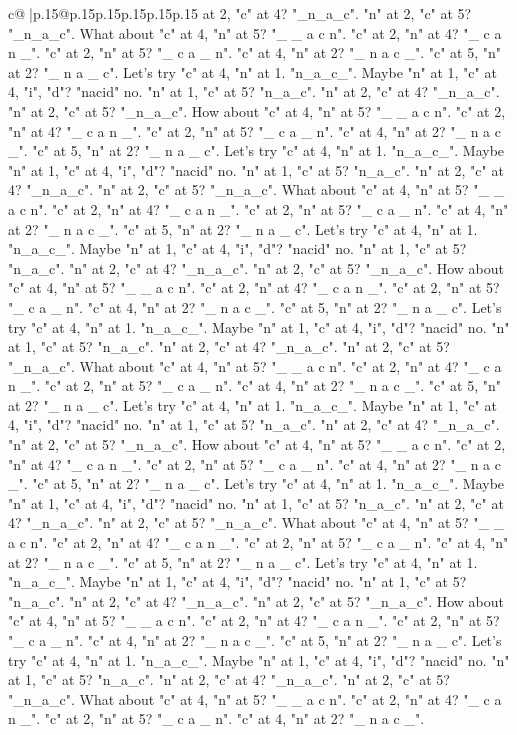 \documentclass{article}
\begin{document}
{\begin{supertabular}{c@{$\;$}|p{.15\linewidth}@{}p{.15\linewidth}p{.15\linewidth}p{.15\linewidth}p{.15\linewidth}p{.15\linewidth}}
{{{at 2, "c" at 4? "\_n\_a\_c". "n" at 2, "c" at 5? "\_n\_a\_c". What about "c" at 4, "n" at 5? "\_ \_ a c n". "c" at 2, "n" at 4? "\_ c a n \_". "c" at 2, "n" at 5? "\_ c a \_ n". "c" at 4, "n" at 2? "\_ n a c \_". "c" at 5, "n" at 2? "\_ n a \_ c". Let's try "c" at 4, "n" at 1. "n\_a\_c\_". Maybe "n" at 1, "c" at 4, "i", "d"? "nacid" no. "n" at 1, "c" at 5? "n\_a\_c". "n" at 2, "c" at 4? "\_n\_a\_c". "n" at 2, "c" at 5? "\_n\_a\_c". How about "c" at 4, "n" at 5? "\_ \_ a c n". "c" at 2, "n" at 4? "\_ c a n \_". "c" at 2, "n" at 5? "\_ c a \_ n". "c" at 4, "n" at 2? "\_ n a c \_". "c" at 5, "n" at 2? "\_ n a \_ c". Let's try "c" at 4, "n" at 1. "n\_a\_c\_". Maybe "n" at 1, "c" at 4, "i", "d"? "nacid" no. "n" at 1, "c" at 5? "n\_a\_c". "n" at 2, "c" at 4? "\_n\_a\_c". "n" at 2, "c" at 5? "\_n\_a\_c". What about "c" at 4, "n" at 5? "\_ \_ a c n". "c" at 2, "n" at 4? "\_ c a n \_". "c" at 2, "n" at 5? "\_ c a \_ n". "c" at 4, "n" at 2? "\_ n a c \_". "c" at 5, "n" at 2? "\_ n a \_ c". Let's try "c" at 4, "n" at 1. "n\_a\_c\_". Maybe "n" at 1, "c" at 4, "i", "d"? "nacid" no. "n" at 1, "c" at 5? "n\_a\_c". "n" at 2, "c" at 4? "\_n\_a\_c". "n" at 2, "c" at 5? "\_n\_a\_c". How about "c" at 4, "n" at 5? "\_ \_ a c n". "c" at 2, "n" at 4? "\_ c a n \_". "c" at 2, "n" at 5? "\_ c a \_ n". "c" at 4, "n" at 2? "\_ n a c \_". "c" at 5, "n" at 2? "\_ n a \_ c". Let's try "c" at 4, "n" at 1. "n\_a\_c\_". Maybe "n" at 1, "c" at 4, "i", "d"? "nacid" no. "n" at 1, "c" at 5? "n\_a\_c". "n" at 2, "c" at 4? "\_n\_a\_c". "n" at 2, "c" at 5? "\_n\_a\_c". What about "c" at 4, "n" at 5? "\_ \_ a c n". "c" at 2, "n" at 4? "\_ c a n \_". "c" at 2, "n" at 5? "\_ c a \_ n". "c" at 4, "n" at 2? "\_ n a c \_". "c" at 5, "n" at 2? "\_ n a \_ c". Let's try "c" at 4, "n" at 1. "n\_a\_c\_". Maybe "n" at 1, "c" at 4, "i", "d"? "nacid" no. "n" at 1, "c" at 5? "n\_a\_c". "n" at 2, "c" at 4? "\_n\_a\_c". "n" at 2, "c" at 5? "\_n\_a\_c". How about "c" at 4, "n" at 5? "\_ \_ a c n". "c" at 2, "n" at 4? "\_ c a n \_". "c" at 2, "n" at 5? "\_ c a \_ n". "c" at 4, "n" at 2? "\_ n a c \_". "c" at 5, "n" at 2? "\_ n a \_ c". Let's try "c" at 4, "n" at 1. "n\_a\_c\_". Maybe "n" at 1, "c" at 4, "i", "d"? "nacid" no. "n" at 1, "c" at 5? "n\_a\_c". "n" at 2, "c" at 4? "\_n\_a\_c". "n" at 2, "c" at 5? "\_n\_a\_c". What about "c" at 4, "n" at 5? "\_ \_ a c n". "c" at 2, "n" at 4? "\_ c a n \_". "c" at 2, "n" at 5? "\_ c a \_ n". "c" at 4, "n" at 2? "\_ n a c \_". "c" at 5, "n" at 2? "\_ n a \_ c". Let's try "c" at 4, "n" at 1. "n\_a\_c\_". Maybe "n" at 1, "c" at 4, "i", "d"? "nacid" no. "n" at 1, "c" at 5? "n\_a\_c". "n" at 2, "c" at 4? "\_n\_a\_c". "n" at 2, "c" at 5? "\_n\_a\_c". How about "c" at 4, "n" at 5? "\_ \_ a c n". "c" at 2, "n" at 4? "\_ c a n \_". "c" at 2, "n" at 5? "\_ c a \_ n". "c" at 4, "n" at 2? "\_ n a c \_". "c" at 5, "n" at 2? "\_ n a \_ c". Let's try "c" at 4, "n" at 1. "n\_a\_c\_". Maybe "n" at 1, "c" at 4, "i", "d"? "nacid" no. "n" at 1, "c" at 5? "n\_a\_c". "n" at 2, "c" at 4? "\_n\_a\_c". "n" at 2, "c" at 5? "\_n\_a\_c". What about "c" at 4, "n" at 5? "\_ \_ a c n". "c" at 2, "n" at 4? "\_ c a n \_". "c" at 2, "n" at 5? "\_ c a \_ n". "c" at 4, "n" at 2? "\_ n a c \_". }}}
\end{supertabular}}
\end{document}
